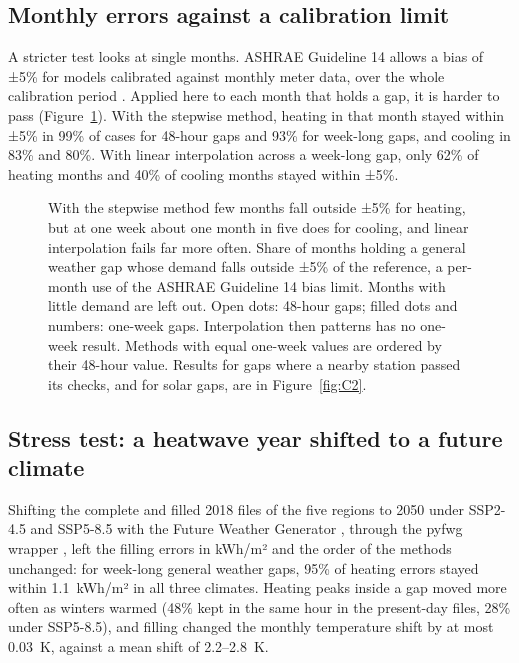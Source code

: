 \subsection{Monthly errors against a calibration limit}\label{sec:5.9}

A stricter test looks at single months. ASHRAE Guideline 14 allows a bias of ±5\% for models calibrated against monthly meter data, over the whole calibration period \citep{ashrae2014}. Applied here to each month that holds a gap, it is harder to pass (Figure~\ref{fig:15}). With the stepwise method, heating in that month stayed within ±5\% in 99\% of cases for 48-hour gaps and 93\% for week-long gaps, and cooling in 83\% and 80\%. With linear interpolation across a week-long gap, only 62\% of heating months and 40\% of cooling months stayed within ±5\%.

\begin{figure}[tbp]
\centering
{}
\caption{With the stepwise method few months fall outside ±5\% for heating, but at one week about one month in five does for cooling, and linear interpolation fails far more often. Share of months holding a general weather gap whose demand falls outside ±5\% of the reference, a per-month use of the ASHRAE Guideline 14 bias limit. Months with little demand are left out. Open dots: 48-hour gaps; filled dots and numbers: one-week gaps. Interpolation then patterns has no one-week result. Methods with equal one-week values are ordered by their 48-hour value. Results for gaps where a nearby station passed its checks, and for solar gaps, are in Figure~\ref{fig:C2}.}
\label{fig:15}
\end{figure}

\subsection{Stress test: a heatwave year shifted to a future climate}\label{sec:5.10}

Shifting the complete and filled 2018 files of the five regions to 2050 under SSP2-4.5 and SSP5-8.5 \citep{oneill2016} with the Future Weather Generator \citep{rodrigues2023}, through the pyfwg wrapper \citep{sanchezgarcia2026}, left the filling errors in kWh/m² and the order of the methods unchanged: for week-long general weather gaps, 95\% of heating errors stayed within 1.1~kWh/m² in all three climates. Heating peaks inside a gap moved more often as winters warmed (48\% kept in the same hour in the present-day files, 28\% under SSP5-8.5), and filling changed the monthly temperature shift by at most 0.03~K, against a mean shift of 2.2--2.8~K.


